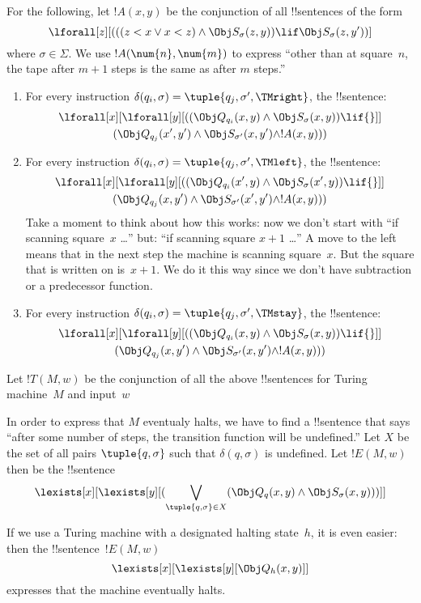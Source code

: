 \documentclass[../../../include/open-logic-section]{subfiles}
\begin{document}
\begin{enumerate}
For the following, let $!A(x, y)$ be the conjunction of all !!{sentence}s
of the form
\[
\lforall[z][
  (((z < x \lor x < z) \land \Obj S_\sigma(z, y))
  \lif \Obj S_\sigma(z, y'))]
\]
where $\sigma \in \Sigma$.  We use $!A(\num{n},\num{m})$ to express
``other than at square~$n$, the tape after $m+1$ steps is the same as
after $m$ steps.''
\begin{enumerate}
\item {} For every instruction $\delta(q_i, \sigma) =
  \tuple{q_j, \sigma', \TMright}$, the !!{sentence}:
\begin{multline*}
\lforall[x][\lforall[y][(
   (\Obj Q_{q_i}(x, y) \land \Obj S_{\sigma}(x, y)) \lif {}]] \\
   (\Obj Q_{q_j}(x', y') \land \Obj S_{\sigma'}(x, y') \land
!A(x, y)))
\end{multline*}
\item {} For every instruction $\delta(q_i, \sigma) =
  \tuple{q_j, \sigma', \TMleft}$, the !!{sentence}:
\begin{multline*}
\lforall[x][\lforall[y][
    ((\Obj Q_{q_i}(x', y) \land \Obj S_{\sigma}(x', y)) \lif {}]]\\
   (\Obj Q_{q_j}(x, y') \land \Obj S_{\sigma'}(x', y') \land
!A(x, y)))
\end{multline*}
Take a moment to think about how this works: now we don't start with
``if scanning square~$x$ \dots'' but: ``if scanning square $x+1$
\dots'' A move to the left means that in the next step the machine is
scanning square~$x$.  But the square that is written on is~$x+1$.  We
do it this way since we don't have subtraction or a predecessor
function.
\item {} For every instruction $\delta(q_i, \sigma) =
  \tuple{q_j, \sigma', \TMstay}$, the !!{sentence}:
\begin{multline*}
\lforall[x][\lforall[y][(
   (\Obj Q_{q_i}(x, y) \land \Obj S_{\sigma}(x, y)) \lif {}]] \\
   (\Obj Q_{q_j}(x, y') \land \Obj S_{\sigma'}(x, y') \land
!A(x, y)))
\end{multline*}
\end{enumerate}
\end{enumerate}
Let $!T(M, w)$ be the conjunction of all the above !!{sentence}s for Turing
machine~$M$ and input~$w$

In order to express that $M$ eventualy halts, we have to find a
!!{sentence} that says ``after some number of steps, the transition
function will be undefined.''  Let $X$ be the set of all pairs
$\tuple{q, \sigma}$ such that $\delta(q, \sigma)$ is undefined.  Let
$!E(M, w)$ then be the !!{sentence}
\[
\lexists[x][\lexists[y][(\bigvee_{\tuple{q, \sigma} \in
      X}(\Obj Q_q(x, y) \land \Obj S_\sigma(x, y)))]]
\]

If we use a Turing machine with a designated halting state~$h$, it
is even easier: then the !!{sentence}~$!E(M, w)$
\[
\lexists[x][\lexists[y][\Obj Q_h(x, y)]]
\]
expresses that the machine eventually halts.
\end{document}
